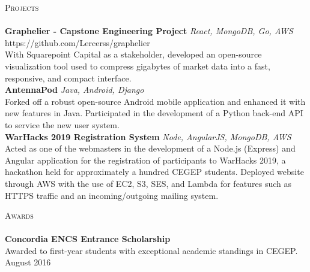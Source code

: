 \documentclass[a4paper]{article}
\newcommand{\lineunder} {
    \vspace*{-8pt} \\
    \hspace*{-18pt} \hrulefill \\
}
\newcommand{\header} [1] {
    {\hspace*{-18pt}\vspace*{6pt} \textsc{#1}}
    \vspace*{-6pt} \lineunder
}
\begin{document}
\header{Projects}
{\textbf{Graphelier - Capstone Engineering Project}} {\sl React, MongoDB, Go, AWS} \hfill https://github.com/Lercerss/graphelier\\
With Squarepoint Capital as a stakeholder, developed an open-source visualization tool used to compress gigabytes of market data into a fast, responsive, and compact interface.\\
\vspace*{2mm}
{\textbf{AntennaPod}} {\sl Java, Android, Django} \\
Forked off a robust open-source Android mobile application and enhanced it with new features in Java.\newline
Participated in the development of a Python back-end API to service the new user system.\\
\vspace*{2mm}
{\textbf{WarHacks 2019 Registration System}} {\sl Node, AngularJS, MongoDB, AWS} \\
Acted as one of the webmasters in the development of a Node.js (Express) and Angular application for the registration of participants to WarHacks 2019, a hackathon held for approximately a hundred CEGEP students.\newline
Deployed website through AWS with the use of EC2, S3, SES, and Lambda for features such as HTTPS traffic and an incoming/outgoing mailing system.\\
\vspace*{2mm}

\header{Awards}
\textbf{Concordia ENCS Entrance Scholarship}\\
Awarded to first-year students with exceptional academic standings in CEGEP. \hfill August 2016\\
\vspace*{2mm}

\ 
\end{document}
